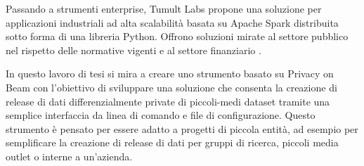 Passando a strumenti enterprise, Tumult Labs propone una soluzione per applicazioni industriali ad alta scalabilità basata su Apache Spark distribuita sotto forma di una libreria Python. Offrono soluzioni mirate al settore pubblico nel rispetto delle normative vigenti e al settore finanziario \cite{tumultanalytics}.

In questo lavoro di tesi si mira a creare uno strumento basato su Privacy on Beam con l'obiettivo di sviluppare una soluzione che consenta la creazione di release di dati differenzialmente private di piccoli-medi dataset tramite una semplice interfaccia da linea di comando e file di configurazione. Questo strumento è pensato per essere adatto a progetti di piccola entità, ad esempio per semplificare la creazione di release di dati per gruppi di ricerca, piccoli media outlet o interne a un'azienda.








